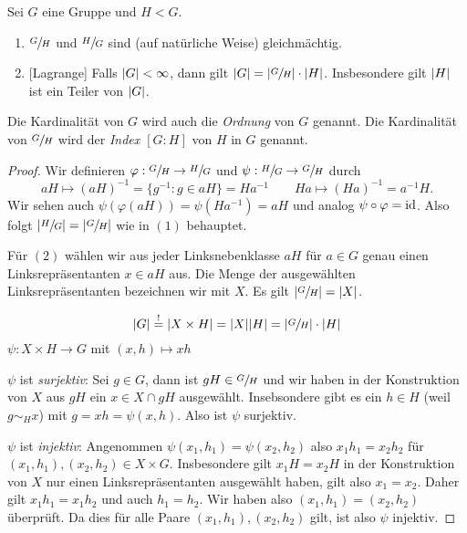 \begin{theorem}
	Sei $G$ eine Gruppe und $H < G$.
	\begin{enumerate}[(1)]
		\item $\sfrac{G}{H}$ und $\sfrac{H}{G}$ sind (auf natürliche Weise) gleichmächtig.
		\item {[Lagrange]} Falls $\abs{G} < \infty$, dann gilt $\abs{G} = \abs{\sfrac{G}{H}} \cdot \abs{H}$.
			Insbesondere gilt $\abs{H}$ ist ein Teiler von $\abs{G}$.
	\end{enumerate}
\end{theorem}

\begin{definition}
	Die Kardinalität von $G$ wird auch die \emph{Ordnung} von $G$ genannt.
	Die Kardinalität von $\sfrac{G}{H}$ wird der \emph{Index $[G:H]$} von $H$ in $G$ genannt.
\end{definition}

\begin{proof}
	Wir definieren $\varphi: \sfrac{G}{H} \to \sfrac{H}{G}$ und $\psi: \sfrac{H}{G} \to \sfrac{G}{H}$ durch
	\[
		a H \mapsto (a H)^{-1} = \{g^{-1}: g \in a H\} = H a^{-1} \qquad H a \mapsto (Ha)^{-1} = a^{-1} H
	.\] 
	Wir sehen auch $\psi(\varphi(aH)) = \psi(H a^{-1}) = a H $ und analog $\psi \circ \varphi = \operatorname{id}$.
	Also folgt $\abs{\sfrac{H}{G}} = \abs{\sfrac{G}{H}}$ wie in $(1)$ behauptet.

	Für $(2)$ wählen wir aus jeder Linksnebenklasse $a H$ für $a \in G$ genau einen Linksrepräsentanten
	$x \in a H$ aus. Die Menge der ausgewählten Linksrepräsentanten bezeichnen wir mit $X$. Es gilt  $\abs{\sfrac{G}{H}} = \abs{X}$.
	\begin{claim}
		\[
			\abs{G} \stackrel{!}{=} \abs{X \times  H} = \abs{X} \abs{H} = \abs{\sfrac{G}{H}} \cdot \abs{H}
		\]
		$\psi: X \times  H \to G$ mit $(x,h) \mapsto  x h $
	\end{claim}
	$\psi$ ist \emph{surjektiv}: Sei $g \in G$, dann ist $gH \in \sfrac{G}{H}$ und wir haben in der Konstruktion von $X$ aus $g H$ ein $x \in X \cap g H$ 
	ausgewählt. Insebsondere gibt es ein $h \in H$ (weil $g \sim_{H} x$) mit $g = xh = \psi(x,h)$. Also ist $\psi$ surjektiv.

	$\psi$ ist \emph{injektiv}: Angenommen $\psi(x_1,h_1) = \psi(x_2,h_2)$ also $x_1 h_1 = x_2 h_2$ für $(x_1,h_1),(x_2,h_2) \in X \times G$.
	Insbesondere gilt $x_1 H = x_2 H$ in der Konstruktion von $X$ nur einen Linksrepräsentanten ausgewählt haben,
	gilt also $x_1 = x_2$. Daher gilt $x_1 h_1 = x_1 h_2$ und auch $h_1 = h_2$. 
	Wir haben also $(x_1,h_1) = (x_2,h_2)$ überprüft. Da dies für alle Paare $(x_1,h_1),(x_2,h_2)$ gilt, ist also $\psi$ injektiv.
\end{proof}

